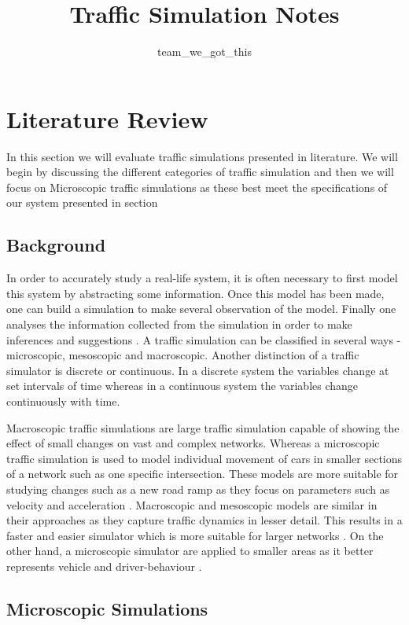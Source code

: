 \documentclass[]{article}
\title{Traffic Simulation Notes}
\author{team\_we\_got\_this}
\begin{document}
\maketitle

\section{Literature Review}

In this section we will evaluate traffic simulations presented in literature. We will begin by discussing the different categories of traffic simulation and then we will focus on Microscopic traffic simulations as these best meet the specifications of our system presented in section %
\subsection{Background}

In order to accurately study a real-life system, it is often necessary to first model this system by abstracting some information. Once this model has been made, one can build a simulation to make several observation of the model. Finally one analyses the information collected from the simulation in order to make inferences and suggestions \cite{sokolowski2011principles}. A traffic simulation can be classified in several ways - microscopic, mesoscopic and macroscopic. Another distinction of a traffic simulator is discrete or continuous. In a discrete system the variables change at set intervals of time whereas in a continuous system the variables change continuously with time. 

Macroscopic traffic simulations are large traffic simulation capable of showing the effect of small changes on vast and complex networks. Whereas a microscopic traffic simulation is used to model individual movement of cars  in smaller sections of a network such as one specific intersection. These models are more suitable for studying changes such as a new road ramp as they focus on parameters such as velocity and acceleration \cite{sokolowski2011principles}. Macroscopic and mesoscopic models are similar in their approaches as they capture traffic dynamics in lesser detail. This results in a faster and easier simulator which is more suitable for larger networks . 
On the other hand, a microscopic simulator are applied to smaller areas as it better represents vehicle and driver-behaviour \cite{burghout2005hybrid}. 


\subsection{Microscopic Simulations}
\end{document}
